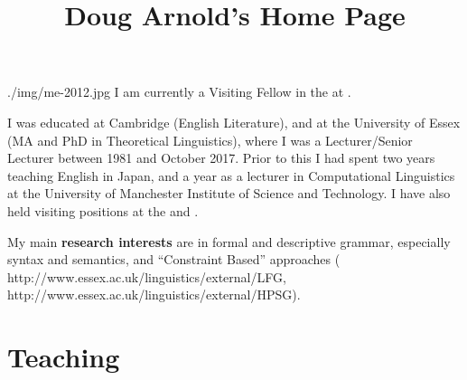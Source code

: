 \documentclass[a4paper]{article}
\title{%
        Doug Arnold's Home Page
      }
\date{}
\author{\MyEmail}
\begin{document}
\maketitle

      {./img/me-2012.jpg}
I am currently a Visiting Fellow in the  at 
. 

I was educated at Cambridge (English Literature), and at the
University of Essex (MA and PhD in Theoretical Linguistics), where I was a
Lecturer/Senior Lecturer between 1981 and October 2017. Prior to this I had spent two years teaching English
in Japan, and a year as a lecturer in Computational Linguistics at
the University of Manchester Institute of Science and Technology. I have also held visiting positions at the  and . 

My main \textbf{research interests} are in formal and descriptive grammar, especially
syntax and semantics, and 
``Constraint Based'' approaches 
(
          {http://www.essex.ac.uk/linguistics/external/LFG},
          {http://www.essex.ac.uk/linguistics/external/HPSG}).




\section{Teaching}
\end{document}
